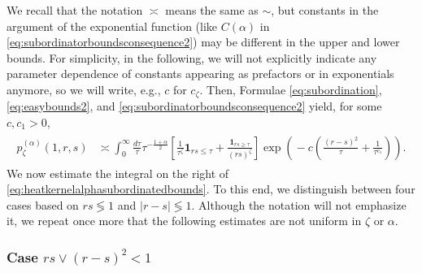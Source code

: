 \documentclass[12pt,reqno,a4paper]{amsart}
\theoremstyle{definition}
\theoremstyle{remark}
\numberwithin{equation}{section}
\newcommand{\1}{\mathbbm{1}}
\def\gb{\mathfrak{B}}
\newcommand{\one}{\mathbf{1}}
\begin{document}
We recall that the notation $\asymp$ means the same as $\sim$, but constants in the argument of the exponential function (like $C(\alpha)$ in \eqref{eq:subordinatorboundsconsequence2}) may be different in the upper and lower bounds.
For simplicity, in the following, we will not explicitly indicate any parameter dependence of constants appearing as prefactors or in exponentials anymore, so we will write, e.g., $c$ for $c_\zeta$.
Then, Formulae \eqref{eq:subordination}, \eqref{eq:easybounds2}, and \eqref{eq:subordinatorboundsconsequence2} yield, for some $c,c_1>0$,
\begin{align}
  \label{eq:heatkernelalphasubordinatedbounds}
  \begin{split}
    p_\zeta^{(\alpha)}(1,r,s)
    & \asymp \int_0^\infty \frac{d\tau}{\tau} \tau^{-\frac{1+\alpha}{2}} \left[\frac{1}{\tau^{\zeta}}\one_{rs\leq\tau} + \frac{\one_{rs\geq\tau}}{(rs)^{\zeta}}\right] \exp\left(\!-c\left(\frac{(r-s)^2}{\tau}+\frac{1}{\tau^{c_1}}\right)\!\right).
  \end{split}
\end{align}
We now estimate the integral on the right of \eqref{eq:heatkernelalphasubordinatedbounds}. To this end, we distinguish between four cases based on $rs\lessgtr1$ and $|r-s|\lessgtr1$. Although the notation will not emphasize it, we repeat once more that the following estimates are not uniform in $\zeta$ or $\alpha$.

\subsubsection{Case $rs\vee(r-s)^2<1$}
\end{document}
